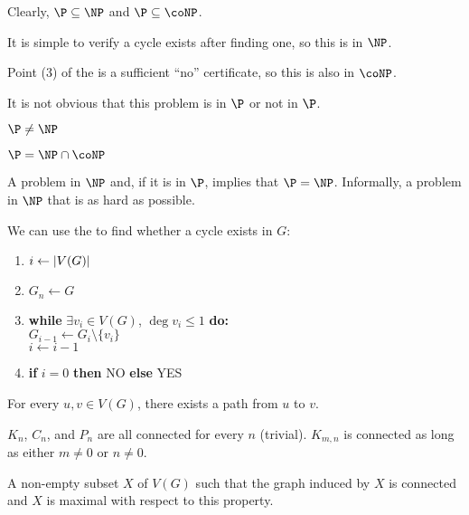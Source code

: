 \documentclass[class=math239,notes,tikz]{agony}
\begin{document}
\begin{remark}
  Clearly, $\P \subseteq \NP$ and $\P \subseteq \coNP$.
\end{remark}

It is simple to verify a cycle exists after finding one, so this is in $\NP$.

Point (3) of the  is a sufficient ``no'' certificate,
so this is also in $\coNP$.

It is not obvious that this problem is in $\P$ or not in $\P$.

\begin{conjecture}
  $\P \neq \NP$
\end{conjecture}

\begin{conjecture}
  $\P = \NP \cap \coNP$
\end{conjecture}

\begin{defn}[$\NP$-complete]
  A problem in $\NP$ and, if it is in $\P$, implies that $\P = \NP$.
  Informally, a problem in $\NP$ that is as hard as possible.
\end{defn}

We can use the  to find whether a cycle exists in $G$:
\begin{enumerate}[1.,nosep]
  \item $i \gets \abs{V(G)}$
  \item $G_n \gets G$
  \item \textbf{while} $\exists v_i \in V(G)$, $\deg v_i \leq 1$ \textbf{do:} \\
        \hspace*{2em} $G_{i-1} \gets G_i \setminus \{v_i\}$ \\
        \hspace*{2em} $i \gets i - 1$
  \item \textbf{if} $i = 0$ \textbf{then} NO \textbf{else} YES
\end{enumerate}

\begin{defn}[connectedness]
  For every $u,v\in V(G)$, there exists a path from $u$ to $v$.
\end{defn}
\begin{example}
  $K_n$, $C_n$, and $P_n$ are all connected for every $n$ (trivial).
  $K_{m,n}$ is connected as long as either $m \neq 0$ or $n \neq 0$.
\end{example}

\begin{defn}[component]
  A non-empty subset $X$ of $V(G)$ such that the graph induced by $X$ is connected
  and $X$ is maximal with respect to this property.
\end{defn}
\end{document}
